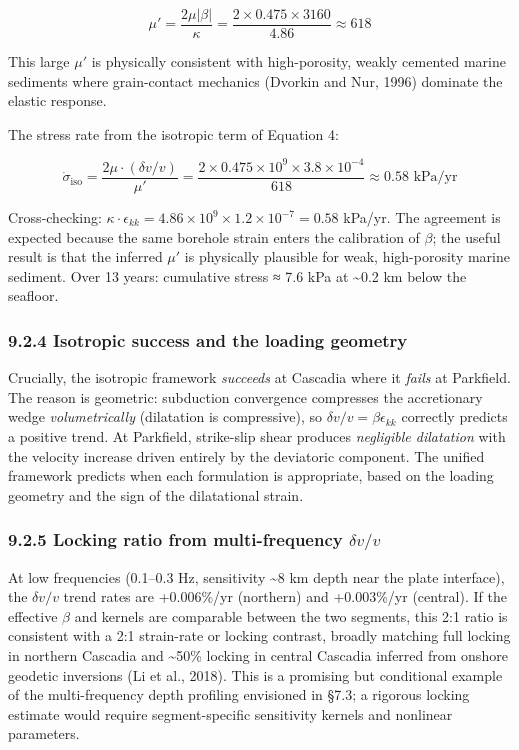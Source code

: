 \documentclass[12pt]{article}
\begin{document}
\[\mu' = \frac{2\mu|\beta|}{\kappa} = \frac{2 \times 0.475 \times 3160}{4.86} \approx 618\]

This large \(\mu'\) is physically consistent with high-porosity, weakly
cemented marine sediments where grain-contact mechanics (Dvorkin and
Nur, 1996) dominate the elastic response.

The stress rate from the isotropic term of Equation 4:

\[\dot{\sigma}_{\text{iso}} = \frac{2\mu \cdot (\delta v/v)}{\mu'} = \frac{2 \times 0.475 \times 10^9 \times 3.8 \times 10^{-4}}{618} \approx 0.58 \text{ kPa/yr}\]

Cross-checking:
\(\kappa \cdot \epsilon_{kk} = 4.86 \times 10^9 \times 1.2 \times 10^{-7} = 0.58\)
kPa/yr. The agreement is expected because the same borehole strain
enters the calibration of \(\beta\); the useful result is that the
inferred \(\mu'\) is physically plausible for weak, high-porosity marine
sediment. Over 13 years: cumulative stress ≈ 7.6 kPa at
\textasciitilde0.2 km below the seafloor.

\subsubsection{9.2.4 Isotropic success and the loading
geometry}\label{isotropic-success-and-the-loading-geometry}

Crucially, the isotropic framework \emph{succeeds} at Cascadia where it
\emph{fails} at Parkfield. The reason is geometric: subduction
convergence compresses the accretionary wedge \emph{volumetrically}
(dilatation is compressive), so \(\delta v/v = \beta\epsilon_{kk}\)
correctly predicts a positive trend. At Parkfield, strike-slip shear
produces \emph{negligible dilatation} with the velocity increase driven
entirely by the deviatoric component. The unified framework predicts
when each formulation is appropriate, based on the loading geometry and
the sign of the dilatational strain.

\subsubsection{\texorpdfstring{9.2.5 Locking ratio from multi-frequency
\(\delta v/v\)}{9.2.5 Locking ratio from multi-frequency \textbackslash delta v/v}}\label{locking-ratio-from-multi-frequency-delta-vv}

At low frequencies (0.1--0.3 Hz, sensitivity \textasciitilde8 km depth
near the plate interface), the \(\delta v/v\) trend rates are
+0.006\%/yr (northern) and +0.003\%/yr (central). If the effective
\(\beta\) and kernels are comparable between the two segments, this 2:1
ratio is consistent with a 2:1 strain-rate or locking contrast, broadly
matching full locking in northern Cascadia and \textasciitilde50\%
locking in central Cascadia inferred from onshore geodetic inversions
(Li et al., 2018). This is a promising but conditional example of the
multi-frequency depth profiling envisioned in §7.3; a rigorous locking
estimate would require segment-specific sensitivity kernels and
nonlinear parameters.
\end{document}
